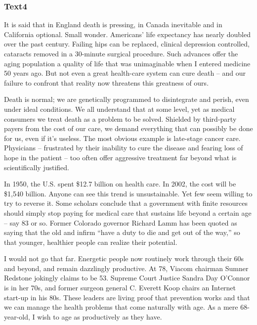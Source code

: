 \documentclass[a4paper]{article}
\begin{document}
\subsubsection{Text4}

\par
It is said that in England death is pressing, in Canada inevitable and in California optional. Small wonder. Americans’ life expectancy has nearly doubled over the past century. Failing hips can be replaced, clinical depression controlled, cataracts removed in a 30-minute surgical procedure. Such advances offer the aging population a quality of life that was unimaginable when I entered medicine 50 years ago. But not even a great health-care system can cure death -- and our failure to confront that reality now threatens this greatness of ours.

\par
Death is normal; we are genetically programmed to disintegrate and perish, even under ideal conditions. We all understand that at some level, yet as medical consumers we treat death as a problem to be solved. Shielded by third-party payers from the cost of our care, we demand everything that can possibly be done for us, even if it’s useless. The most obvious example is late-stage cancer care. Physicians -- frustrated by their inability to cure the disease and fearing loss of hope in the patient -- too often offer aggressive treatment far beyond what is scientifically justified.

\par
In 1950, the U.S. spent \$12.7 billion on health care. In 2002, the cost will be \$1,540 billion. Anyone can see this trend is unsustainable. Yet few seem willing to try to reverse it. Some scholars conclude that a government with finite resources should simply stop paying for medical care that sustains life beyond a certain age -- say 83 or so. Former Colorado governor Richard Lamm has been quoted as saying that the old and infirm “have a duty to die and get out of the way,” so that younger, healthier people can realize their potential.

\par
I would not go that far. Energetic people now routinely work through their 60s and beyond, and remain dazzlingly productive. At 78, Viacom chairman Sumner Redstone jokingly claims to be 53. Supreme Court Justice Sandra Day O’Connor is in her 70s, and former surgeon general C. Everett Koop chairs an Internet start-up in his 80s. These leaders are living proof that prevention works and that we can manage the health problems that come naturally with age. As a mere 68-year-old, I wish to age as productively as they have.
\end{document}
